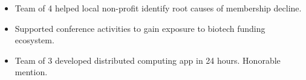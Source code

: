 \documentclass[margin]{res}
\begin{document}
\begin{sloppypar}
\begin{resume}
    \begin{itemize}
        \item Team of 4 helped local non-profit identify root causes of membership decline.
    \end{itemize}

    \begin{itemize}
        \item Supported conference activities to gain exposure to biotech funding ecosystem.
    \end{itemize}
    \begin{itemize}
        \item Team of 3 developed distributed computing app in 24 hours. Honorable mention.
    \end{itemize}



\end{resume}
\end{sloppypar}
\end{document}
